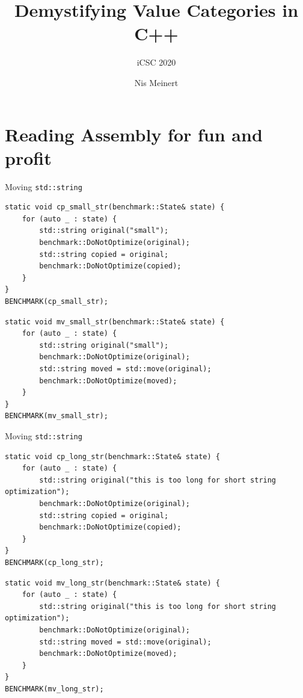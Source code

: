 \documentclass[compress,aspectratio=1610]{beamer}
\title{Demystifying Value Categories in C++}
\subtitle{iCSC 2020}
\institute{Rostock University}
\author{Nis Meinert}
\date{}
\begin{document}
\maketitle

\section{Reading Assembly for fun and profit}

\begin{frame}[fragile]{Moving \texttt{std::string}}
    \centering

    \begin{lstlisting}
static void cp_small_str(benchmark::State& state) {
    for (auto _ : state) {
        std::string original("small");
        benchmark::DoNotOptimize(original);
        std::string copied = original;
        benchmark::DoNotOptimize(copied);
    }
}
BENCHMARK(cp_small_str);
    \end{lstlisting}

    \begin{lstlisting}
static void mv_small_str(benchmark::State& state) {
    for (auto _ : state) {
        std::string original("small");
        benchmark::DoNotOptimize(original);
        std::string moved = std::move(original);
        benchmark::DoNotOptimize(moved);
    }
}
BENCHMARK(mv_small_str);
    \end{lstlisting}
\end{frame}

\begin{frame}[fragile]{Moving \texttt{std::string}}
    \centering

    \begin{lstlisting}
static void cp_long_str(benchmark::State& state) {
    for (auto _ : state) {
        std::string original("this is too long for short string optimization");
        benchmark::DoNotOptimize(original);
        std::string copied = original;
        benchmark::DoNotOptimize(copied);
    }
}
BENCHMARK(cp_long_str);
    \end{lstlisting}

    \begin{lstlisting}
static void mv_long_str(benchmark::State& state) {
    for (auto _ : state) {
        std::string original("this is too long for short string optimization");
        benchmark::DoNotOptimize(original);
        std::string moved = std::move(original);
        benchmark::DoNotOptimize(moved);
    }
}
BENCHMARK(mv_long_str);
    \end{lstlisting}
\end{frame}
\end{document}
